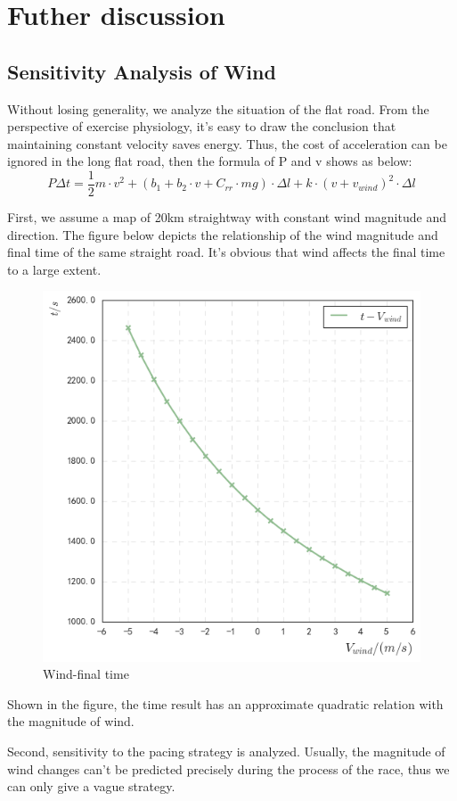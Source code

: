 \documentclass{mcmthesis}
\begin{document}
\section{Futher discussion}


\subsection{Sensitivity Analysis of Wind}
Without losing generality, we analyze the situation of the flat road. From the perspective of exercise physiology, it's easy to draw the conclusion that maintaining constant velocity saves energy. Thus, the cost of acceleration can be ignored in the long flat road, then the formula of P and v shows as below:
\begin{equation}
    P\Delta t=\frac{1}{2}m\cdot v^2+(b_1+b_2\cdot v+C_{rr}\cdot mg)\cdot \Delta l+k\cdot (v+v_{wind})^2\cdot \Delta l
\end{equation}
\par
First, we assume a map of 20km straightway with constant wind magnitude and direction.
The figure below depicts the relationship of the wind magnitude and final time of the same straight road. It's obvious that wind affects the final time to a large extent.
\begin{figure}[H]
\small
\centering
\includegraphics[width=6
cm]{mcmthesis/figures/t-wind.png}
\caption{Wind-final time} 
\end{figure}
Shown in the figure, the time result has an approximate quadratic relation with the magnitude of wind.

Second, sensitivity to the pacing strategy is analyzed. 
Usually, the magnitude of wind changes can't be predicted precisely during the process of the race, thus we can only give a vague strategy.
\end{document}
